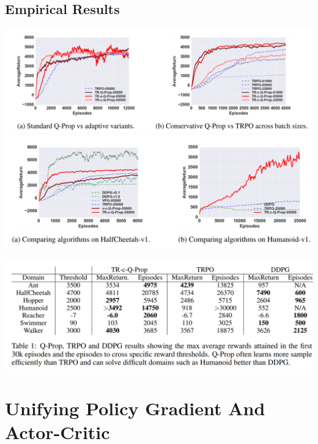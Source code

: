 \documentclass{beamer}
\begin{document}
\subsection{Empirical Results}
\begin{frame}[t]
\includegraphics[scale=0.23]{q-prop1}
\includegraphics[scale=0.23]{q-prop2}
\end{frame}

\begin{frame}
\includegraphics[scale=0.21]{q-prop3}
\end{frame}

\section{Unifying Policy Gradient And Actor-Critic}
\end{document}
